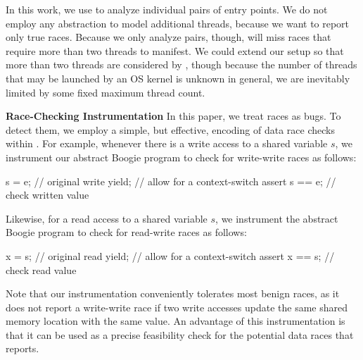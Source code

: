 In this work, we use \corral to analyze individual pairs of entry points.
We do not employ any abstraction to model additional threads, because we want \corral to report only true races. Because we only analyze pairs, though, \corral will miss races that require more than two threads to manifest.
We could extend our setup so that more than two threads are considered by \corral, though because the number of threads that may be launched by an OS kernel is unknown in general, we are inevitably limited by some fixed maximum thread count.

\medskip\noindent\textbf{Race-Checking Instrumentation }
%
In this paper, we treat races as bugs. To detect them, we employ a simple, but effective, encoding of data race checks within \corral. For example, whenever there is a write access to a shared variable $s$, we instrument our abstract Boogie program to check for write-write races as follows:
%
\begin{boogie}
s = e;         // original write
yield;         // allow for a context-switch
assert s == e; // check written value
\end{boogie}
%
Likewise, for a read access to a shared variable $s$, we instrument the abstract Boogie program to check for read-write races as follows:
%
\begin{boogie}
x = s;         // original read
yield;         // allow for a context-switch
assert x == s; // check read value
\end{boogie}

Note that our instrumentation conveniently tolerates most benign races, as it does not report a write-write race if two write accesses update the same shared memory location with the same value.  An advantage of this instrumentation is that it can be used as a precise feasibility check for the potential data races that \whoop reports.
